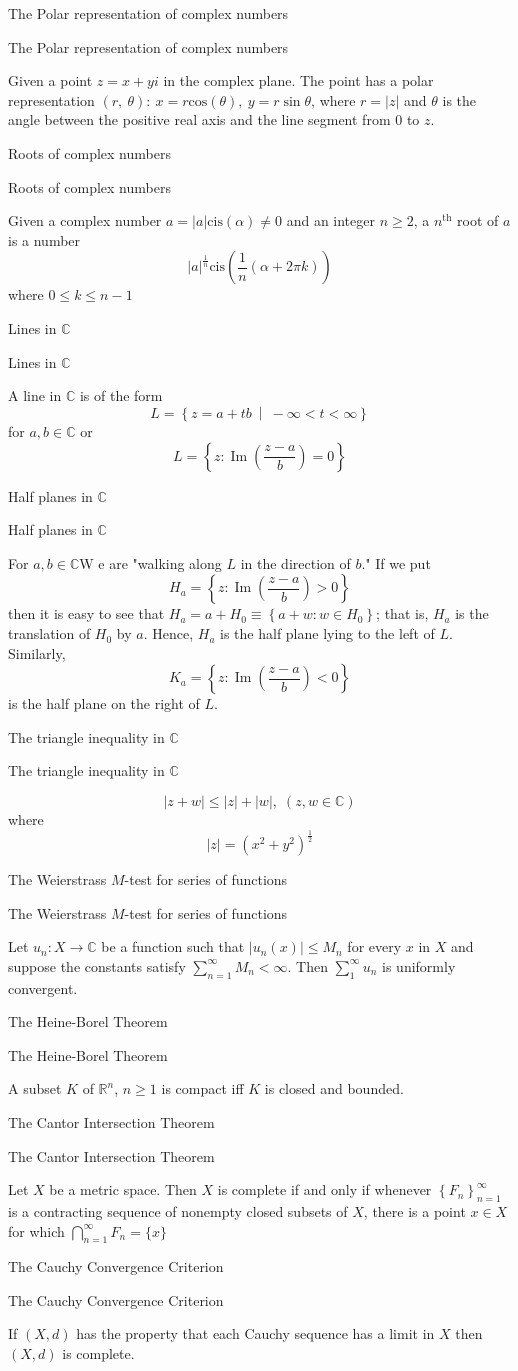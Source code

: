 \documentclass[17pt]{extarticle}
\newcommand{\R}{\mathbb{R}}
\newcommand{\C}{\mathbb{C}}
\newcommand{\LS}{\left\lbrace}
\newcommand{\RS}{\right\rbrace}
\newcommand{\MM}{\ \middle|\ }
\renewcommand{\cos}[1]{\text{cos}\left(#1\right)}
\newcommand{\boxset}[2]{\begin{mdframed}[style=darkQuesion]
#1
\end{mdframed}
\newpage
\begin{mdframed}[style=darkQuesion]
  #1
    \end{mdframed}
\begin{mdframed}[style=darkAnswer]
  #2
    \end{mdframed}
    \newpage
}
\begin{document}
\par
\newpage
\boxset{The Polar representation of complex numbers}
{Given a point $z=x+yi$ in the complex plane. The point has a polar
representation $\left( r,\ \theta\right):\ x=r\cos{\theta},\ y=r\sin{\theta}$, where $r=\left|z\right|$
and $\theta$ is the angle between the positive real axis and the line
segment from $0$ to $z$.}
\boxset{Roots of complex numbers}
{Given a complex number $a=\left|a\right|\text{cis}\left(\alpha\right)\neq 0$ and an integer
$n\geq 2$, a $n^{\text{th}}$
root of $a$ is a number
\[\left|a\right|^{\frac{1}{n}}\text{cis}\left( \frac{1}{n}\left( \alpha+2\pi k\right)\right)\]
where $0\leq k \leq n-1$
}
\boxset{Lines in $\C$}
{A line in $\C$ is of the form
\[L=\LS z=a+tb\MM -\infty<t<\infty\RS \]
for $a,b\in\C$ or
\[L=\left\{z: \operatorname{Im}\left(\frac{z-a}{b}\right)=0\right\}\]
}
\boxset{Half planes in $\C$}
{For $a,b\in\C$W e are "walking along $L$ in the direction of $b$." If we put
\[H_{a}=\left\{z: \operatorname{Im}\left(\frac{z-a}{b}\right)>0\right\}\]
then it is easy to see that $H_{a}=a+H_{0} \equiv\left\{a+w: w \in H_{0}\right\}$; that is, $H_{a}$ is the translation of $H_{0}$ by $a$. Hence, $H_{a}$ is the half plane lying to the left of $L$. Similarly,
\[K_{a}=\left\{z: \operatorname{Im}\left(\frac{z-a}{b}\right)<0\right\}\]
is the half plane on the right of $L$.}
\boxset{The triangle inequality in $\C$}
{\[|z+w| \leq|z|+|w|,\;(z, w \in \C)\]
where
\[|z|=\left(x^{2}+y^{2}\right)^{\frac{1}{2}}\]
}
\boxset{The Weierstrass $M$-test for series of functions}
{
Let $u_{n}: X \rightarrow \C$ be a function such that $\left|u_{n}(x)\right| \leq M_{n}$ for every $x$ in $X$ and suppose the constants satisfy $\sum_{n=1}^{\infty} M_{n}<\infty$. Then $\sum_{1}^{\infty} u_{n}$ is uniformly convergent.
}
\boxset{The Heine-Borel Theorem}
{A subset $K$ of $\R^n$, $n\geq 1$ is compact iff $K$ is closed and bounded.}
\boxset{The Cantor Intersection Theorem}
{Let $X$ be a metric space. Then $X$ is complete if and only if whenever $\left\{F_{n}\right\}_{n=1}^{\infty}$ is a contracting sequence of nonempty closed subsets of $X$, there is a point $x \in X$ for which $\bigcap_{n=1}^{\infty} F_{n}=\{x\}$}
\boxset{The Cauchy Convergence Criterion}
{If $(X, d)$ has the property that each Cauchy sequence has a limit in $X$ then $(X, d)$ is complete.}
\end{document}
